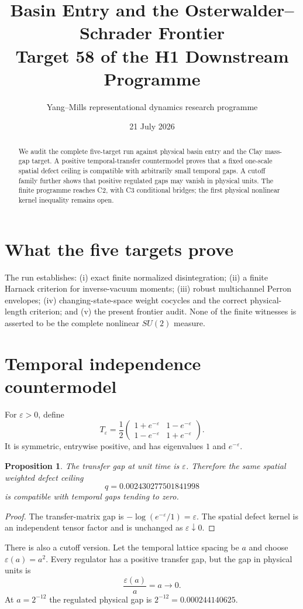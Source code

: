 \documentclass[11pt]{article}
\title{Basin Entry and the Osterwalder--Schrader Frontier\\Target 58 of the H1 Downstream Programme}
\author{Yang--Mills representational dynamics research programme}
\date{21 July 2026}
\newtheorem{proposition}{Proposition}
\begin{document}
\maketitle
\begin{abstract}
We audit the complete five-target run against physical basin entry and the
Clay mass-gap target.  A positive temporal-transfer countermodel proves that a
fixed one-scale spatial defect ceiling is compatible with arbitrarily small
temporal gaps.  A cutoff family further shows that positive regulated gaps may
vanish in physical units.  The finite programme reaches C2, with C3
conditional bridges; the first physical nonlinear kernel inequality remains
open.
\end{abstract}

\section{What the five targets prove}
The run establishes: (i) exact finite normalized disintegration; (ii) a finite
Harnack criterion for inverse-vacuum moments; (iii) robust multichannel Perron
envelopes; (iv) changing-state-space weight cocycles and the correct
physical-length criterion; and (v) the present frontier audit.  None of the
finite witnesses is asserted to be the complete nonlinear $SU(2)$ measure.

\section{Temporal independence countermodel}
For $\varepsilon>0$, define
\[
 T_\varepsilon=\frac12
 \begin{pmatrix}
 1+e^{-\varepsilon}&1-e^{-\varepsilon}\\
 1-e^{-\varepsilon}&1+e^{-\varepsilon}
 \end{pmatrix}.
\]
It is symmetric, entrywise positive, and has eigenvalues $1$ and
$e^{-\varepsilon}$.
\begin{proposition}
The transfer gap at unit time is $\varepsilon$.  Therefore the same spatial
weighted defect ceiling
\[
 q=0.002430277501841998
\]
is compatible with temporal gaps tending to zero.
\end{proposition}
\begin{proof}
The transfer-matrix gap is
$-\log(e^{-\varepsilon}/1)=\varepsilon$.  The spatial defect kernel is an
independent tensor factor and is unchanged as $\varepsilon\downarrow0$.
\end{proof}

There is also a cutoff version.  Let the temporal lattice spacing be $a$ and
choose $\varepsilon(a)=a^2$.  Every regulator has a positive transfer gap, but
the gap in physical units is
\[
 \frac{\varepsilon(a)}a=a\longrightarrow0.
\]
At $a=2^{-12}$ the regulated physical gap is $2^{-12}=0.000244140625$.
\end{document}
